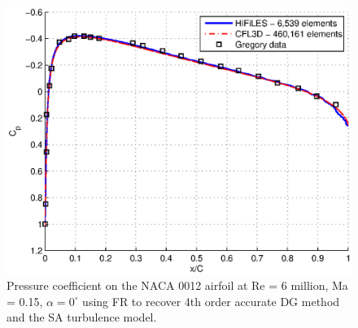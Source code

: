 \begin{figure}
  \includegraphics{cp.eps}
  \caption{Pressure coefficient on the NACA 0012 airfoil at Re = 6 million, Ma = 0.15, $\alpha = 0^{\circ}$ using FR to recover 4th order accurate DG method and the SA turbulence model.}
  \label{RANS_naca0012_cp}
\end{figure}

